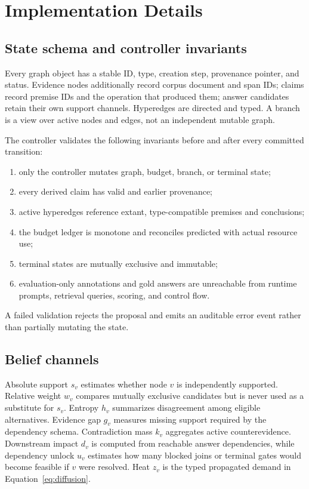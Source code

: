 \section{Implementation Details}
\label{app:details}

\subsection{State schema and controller invariants}

Every graph object has a stable ID, type, creation step, provenance pointer, and status. Evidence nodes additionally record corpus document and span IDs; claims record premise IDs and the operation that produced them; answer candidates retain their own support channels. Hyperedges are directed and typed. A branch is a view over active nodes and edges, not an independent mutable graph.

The controller validates the following invariants before and after every committed transition:
\begin{enumerate}[leftmargin=*]
  \item only the controller mutates graph, budget, branch, or terminal state;
  \item every derived claim has valid and earlier provenance;
  \item active hyperedges reference extant, type-compatible premises and conclusions;
  \item the budget ledger is monotone and reconciles predicted with actual resource use;
  \item terminal states are mutually exclusive and immutable;
  \item evaluation-only annotations and gold answers are unreachable from runtime prompts, retrieval queries, scoring, and control flow.
\end{enumerate}
A failed validation rejects the proposal and emits an auditable error event rather than partially mutating the state.

\subsection{Belief channels}

Absolute support $s_v$ estimates whether node $v$ is independently supported. Relative weight $w_v$ compares mutually exclusive candidates but is never used as a substitute for $s_v$. Entropy $h_v$ summarizes disagreement among eligible alternatives. Evidence gap $g_v$ measures missing support required by the dependency schema. Contradiction mass $k_v$ aggregates active counterevidence. Downstream impact $d_v$ is computed from reachable answer dependencies, while dependency unlock $u_v$ estimates how many blocked joins or terminal gates would become feasible if $v$ were resolved. Heat $z_v$ is the typed propagated demand in Equation~\ref{eq:diffusion}.

